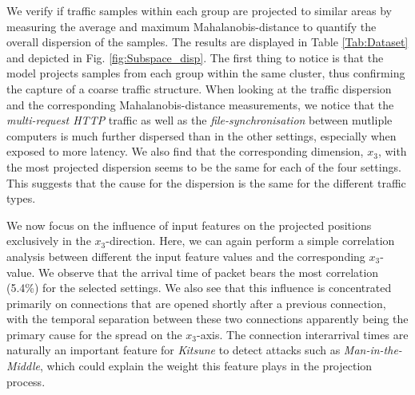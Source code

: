\documentclass[runningheads]{llncs}
\begin{document}
We verify if traffic samples within each group are projected to similar areas by measuring the average and maximum Mahalanobis-distance to quantify the overall dispersion of the samples. The results are displayed in Table \ref{Tab:Dataset} and depicted in Fig. \ref{fig:Subspace_disp}. The first thing to notice is that the model projects samples from each group within the same cluster, thus confirming the capture of a coarse traffic structure. When looking at the traffic dispersion and the corresponding Mahalanobis-distance measurements, we notice that the \textit{multi-request HTTP} traffic as well as the \textit{file-synchronisation} between mutliple computers is much further dispersed than in the other settings, especially when exposed to more latency. We also find that the corresponding dimension, $x_3$, with the most projected dispersion seems to be the same for each of the four settings. This suggests that the cause for the dispersion is the same for the different traffic types. 

We now focus on the influence of input features on the projected positions exclusively in the $x_3$-direction. Here, we can again perform a simple correlation analysis between different the input feature values and the corresponding $x_3$-value. We observe that the arrival time of packet bears the most correlation (5.4\%) for the selected settings. We also see that this influence is concentrated primarily on connections that are opened shortly after a previous connection, with the temporal separation between these two connections apparently being the primary cause for the spread on the $x_3$-axis. The connection interarrival times are naturally an important feature for \textit{Kitsune} to detect attacks such as \textit{Man-in-the-Middle}, which could explain the weight this feature plays in the projection process.

\end{document}

